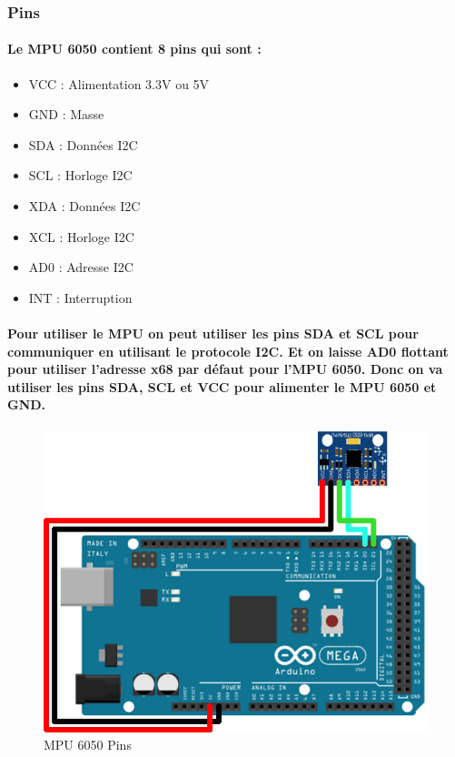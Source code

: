 \subsubsection{Pins}

\paragraph{Le MPU 6050 contient 8 pins qui sont :}

\begin{itemize}
	\item VCC : Alimentation 3.3V ou 5V
	\item GND : Masse
	\item SDA : Données I2C
	\item SCL : Horloge I2C
	\item XDA : Données I2C
	\item XCL : Horloge I2C
	\item AD0 : Adresse I2C
	\item INT : Interruption
\end{itemize}

\paragraph{Pour utiliser le MPU on peut utiliser les pins SDA et SCL pour communiquer en utilisant le protocole I2C. Et on laisse AD0 flottant pour utiliser l'adresse x68 par défaut pour l'MPU 6050. Donc on va utiliser les pins SDA, SCL et VCC pour alimenter le MPU 6050 et GND.}

\begin{figure}[!htpb]
	\centering
	\includegraphics[width=0.7\linewidth]{Figures/mpu-pinning.png}
	\caption{MPU 6050 Pins}
	\label{fig:MPU6050Pins}
\end{figure}

